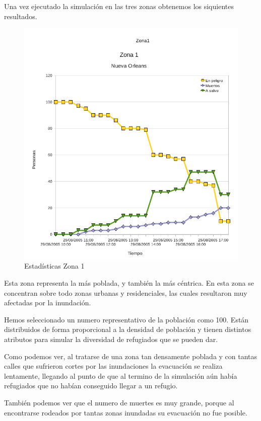 Una vez ejecutado la simulación en las tres zonas obtenemos los siquientes
resultados.

\begin{figure}[H]
 \centering
 \includegraphics[width=135mm]{figuras/cap6/stats/Zona1.png}
 \caption{Estadísticas Zona 1}
\end{figure}

Esta zona representa la más poblada, y también la más céntrica. En esta zona se
concentran sobre todo zonas urbanas y residenciales, las cuales resultaron muy
afectadas por la inundación.

Hemos seleccionado un numero representativo de la población como 100. Están
distribuidos de forma proporcional a la densidad de población y tienen
distintos atributos para simular la diversidad de refugiados que se pueden dar.

Como podemos ver, al tratarse de una zona tan densamente poblada y con tantas
calles que sufrieron cortes por las inundaciones la evacuación se realiza
lentamente, llegando al punto de que al termino de la simulación aún había
refugiados que no habían conseguido llegar a un refugio.

También podemos ver que el numero de muertes es muy grande, porque al
encontrarse rodeados por tantas zonas inundadas su evacuación no fue posible.

